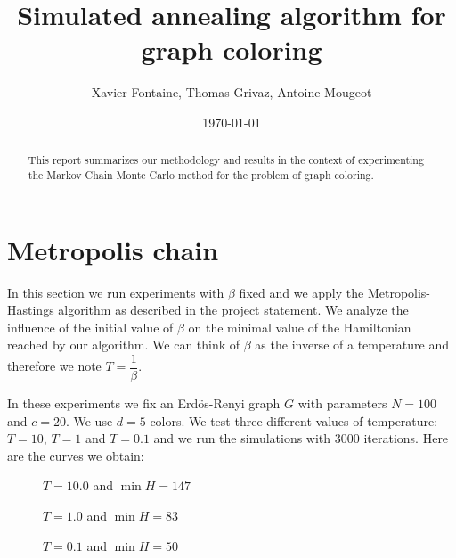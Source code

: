 \documentclass[a4paper]{article}
\title{Simulated annealing algorithm for graph coloring}
\author{Xavier Fontaine, Thomas Grivaz, Antoine Mougeot}
\date{\today}
\begin{document}
\maketitle

\begin{abstract}
This report summarizes our methodology and results in the context of experimenting the Markov Chain Monte Carlo method for the problem of graph coloring.
\end{abstract}

\section{Metropolis chain}
\label{sec2}

In this section we run experiments with $\beta$ fixed and we apply the Metropolis-Hastings algorithm as described in the project statement. We analyze the influence of the initial value of $\beta$ on the minimal value of the Hamiltonian reached by our algorithm. We can think of $\beta$ as the inverse of a temperature and therefore we note $T=\dfrac{1}{\beta}$.

In these experiments we fix an Erdös-Renyi graph $G$ with parameters $N=100$ and $c=20$. We use $d=5$ colors. We test three different values of temperature: $T=10$, $T=1$ and $T=0.1$ and we run the simulations with $3000$ iterations. Here are the curves we obtain:

\begin{figure}[H]
 \begin{minipage}[b]{.3\linewidth}
  \centering{}
  \caption{$T=10.0$ and $\min H=147$ \label{fix10}}
 \end{minipage} \hfill
 \begin{minipage}[b]{.3\linewidth}
  \centering{}
  \caption{$T=1.0$ and $\min H=83$ \label{fix1}}
 \end{minipage} \hfill
 \begin{minipage}[b]{.3\linewidth}
  \centering{}
  \caption{$T=0.1$ and $\min H=50$ \label{fix01}}
 \end{minipage}
\end{figure}
\end{document}

